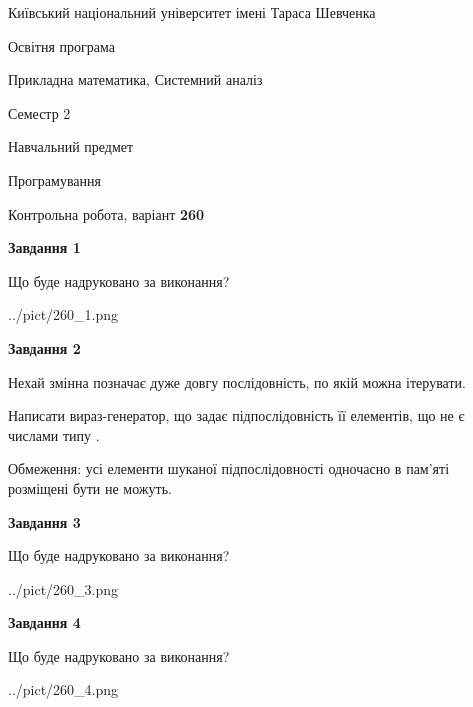 \documentclass[12pt, ukrainian]{article}
\begin{document}
{{\begin {small}\par
{ \center  Київський національний університет імені Тараса Шевченка \par}
{\parbox {5 cm}{Освітня програма \hfill}{\parbox {8 cm}{Прикладна математика, Системний аналіз \hfill}}\parbox {5 cm}{\hfill Семестр 2}}\par
{\parbox {5 cm} {Навчальний предмет \hfill}\parbox {7 cm}{Програмування \hfill}\parbox {6cm}{\hfill}\par}\vspace{-7pt} \end{small}}{\center Контрольна робота, варіант  \No \textbf
{ 260 }\par}}
{
\begin {large}
{\begin {center}\textbf{Завдання 1}\end {center}}\par
Що буде надруковано за виконання?\par\par
\begin{center}
	{../pict/260_1.png}
\end{center}
\newpage

{\begin {center}\textbf{Завдання 2}\end {center}}\par
Нехай змінна  позначає дуже довгу послідовність, по якій можна ітерувати.

Написати вираз-генератор, що задає підпослідовність її елементів, що не є числами типу .

Обмеження: усі елементи шуканої підпослідовності одночасно в пам'яті розміщені бути не можуть.\par
\newpage

{\begin {center}\textbf{Завдання 3}\end {center}}\par
Що буде надруковано за виконання?\par
\begin{center}
	{../pict/260_3.png}
\end{center}
\newpage

{\begin {center}\textbf{Завдання 4}\end {center}}\par
Що буде надруковано за виконання?\par
\begin{center}
	{../pict/260_4.png}
\end{center}
\newpage


\end{large}}
\end{document}
